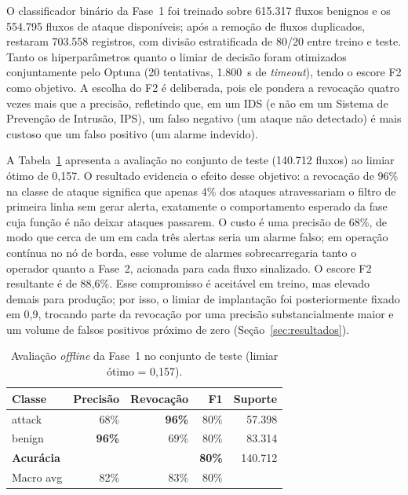 \documentclass[12pt,a4paper]{article}
\begin{document}
O classificador binário da Fase~1 foi treinado sobre 615.317 fluxos
benignos e os 554.795 fluxos de ataque disponíveis; após a remoção de fluxos
duplicados, restaram 703.558 registros, com divisão estratificada de 80/20 entre
treino e teste. Tanto os hiperparâmetros quanto o limiar de decisão foram
otimizados conjuntamente pelo Optuna (20 tentativas, 1.800~s de
\textit{timeout}), tendo o escore F2 como objetivo. A escolha do F2 é
deliberada, pois ele pondera a revocação quatro vezes mais que a precisão,
refletindo que, em um IDS (e não em um Sistema de Prevenção de Intrusão, IPS),
um falso negativo (um ataque não detectado) é mais custoso que um falso positivo
(um alarme indevido).

A Tabela~\ref{tab:phase1_offline} apresenta a avaliação no conjunto de teste
(140.712 fluxos) ao limiar ótimo de 0,157. O resultado evidencia o efeito desse
objetivo: a revocação de 96\% na classe de ataque significa que apenas 4\% dos
ataques atravessariam o filtro de primeira linha sem gerar alerta, exatamente o
comportamento esperado da fase cuja função é não deixar ataques passarem. O
custo é uma precisão de 68\%, de modo que cerca de um em cada três alertas seria
um alarme falso; em operação contínua no nó de borda, esse volume de alarmes
sobrecarregaria tanto o operador quanto a Fase~2, acionada para cada fluxo
sinalizado. O escore F2 resultante é de 88,6\%. Esse compromisso é aceitável em
treino, mas elevado demais para produção; por isso, o limiar de implantação foi
posteriormente fixado em 0,9, trocando parte da revocação por uma precisão
substancialmente maior e um volume de falsos positivos próximo de zero
(Seção~\ref{sec:resultados}).

\begin{table}[ht]
\centering
\caption{Avaliação \textit{offline} da Fase~1 no conjunto de teste (limiar ótimo = 0,157).}
\label{tab:phase1_offline}
\begin{tabular}{@{}lrrrr@{}}
\toprule
\textbf{Classe} & \textbf{Precisão} & \textbf{Revocação} & \textbf{F1} & \textbf{Suporte} \\ \midrule
attack  & 68\% & \textbf{96\%} & 80\% & 57.398 \\
benign  & \textbf{96\%} & 69\% & 80\% & 83.314 \\ \midrule
\textbf{Acurácia} & & & \textbf{80\%} & 140.712 \\
Macro avg & 82\% & 83\% & 80\% & \\
\bottomrule
\end{tabular}
\end{table}
\end{document}
